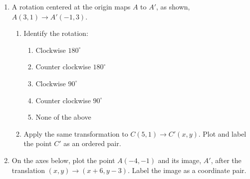 \documentclass[12pt, twoside]{article}
\begin{document}
\begin{enumerate}
\begin{multicols}{2}
      \begin{enumerate}
        \item $E \rightarrow$ \vspace{1.5cm}
        \item $F \rightarrow$ \vspace{1.5cm}
        \item $\overline{DF} \rightarrow$ \vspace{1.5cm}
      \end{enumerate}
    \end{multicols}

\item A rotation centered at the origin maps $A$ to $A'$, as shown, $A(3,1) \rightarrow A'(-1,3)$.
\begin{multicols}{2}
  \begin{enumerate}
    \item Identify the rotation:
    \begin{enumerate}[label=(\Alph*)]
      \item Clockwise $180^\circ$
      \item Counter clockwise $180^\circ$
      \item Clockwise $90^\circ$
      \item Counter clockwise $90^\circ$
      \item None of the above
    \end{enumerate} \vspace{1cm}
    \item Apply the same transformation to $C(5,1)\rightarrow C'(x,y)$. Plot and label the point $C'$ as an ordered pair.
    \end{enumerate}
    \begin{flushright}
    \end{flushright}
\end{multicols}

\newpage
\item On the axes below, plot the point $A(-4,-1)$ and its image, $A'$, after the translation $(x,y) \rightarrow (x+6,y-3)$. Label the image as a coordinate pair.
    \begin{center}
  \end{center}


\end{enumerate}
\end{document}
